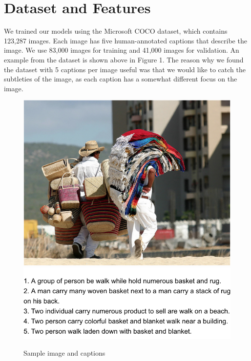 \documentclass{article}
\begin{document}

\section{Dataset and Features}
\label{dataset}

We trained our models using the Microsoft COCO dataset, which contains 123,287 images. Each image has five human-annotated captions that describe the image. We use 83,000 images for training and 41,000 images for validation. An example from the dataset is shown above in Figure 1. The reason why we found the dataset with 5 captions per image useful was that we would like to catch the subtleties of the image, as each caption has a somewhat different focus on the image.

\begin{figure}
\graphicspath{ {./images/} }
    \centering
    \includegraphics[scale=0.32]{Image}
    \hspace{0.5cm}
    \includegraphics[scale=0.4]{dataset2}
    \caption{Sample image and captions}
    \label{fig:my_label}
\end{figure}
\end{document}
